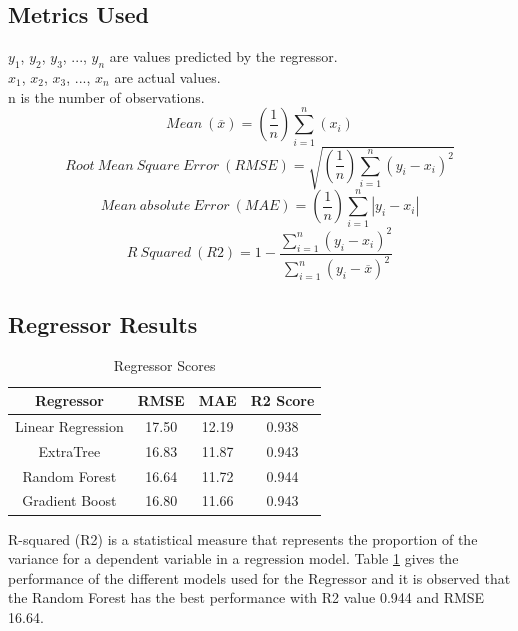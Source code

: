 \documentclass[12pt]{article}
\begin{document}
\subsection{Metrics Used}
$y_{1}$, $y_{2}$, $y_{3}$, ..., $y_{n}$ are values predicted by the regressor.\\
$x_{1}$, $x_{2}$, $x_{3}$, ..., $x_{n}$ are actual values.\\
 n is the number of observations.\\ 
$$Mean\ (\overline{x}) =(\frac{1}{n})\sum_{i=1}^{n}(x_{i})$$
$$Root\ Mean\ Square\ Error\ (RMSE) =\sqrt{(\frac{1}{n})\sum_{i=1}^{n}(y_{i} - x_{i})^{2}}$$
$$Mean\ absolute\ Error\ (MAE)=(\frac{1}{n})\sum_{i=1}^{n}\left | y_{i} - x_{i} \right |$$
$$R\ Squared\ (R2)= 1 - \frac{\sum_{i=1}^{n}(y_{i} - x_{i})^{2}}{\sum_{i=1}^{n}(y_{i} - \overline{x})^{2}}$$ 
 
\subsection{Regressor Results}
\begin{table}[H]
    \centering
    \begin{tabular}{|c|c|c|c|}
    \hline
    \textbf{Regressor} & \textbf{RMSE} & \textbf{MAE} & \textbf{R2 Score} \\
    \hline
    Linear Regression & 17.50 & 12.19 & 0.938 \\
    \hline
    ExtraTree & 16.83 & 11.87 & 0.943 \\
    \hline
    Random Forest & 16.64 & 11.72 & 0.944 \\
    \hline
    Gradient Boost & 16.80 & 11.66 & 0.943 \\
    \hline
    \end{tabular}
    \caption{Regressor Scores}
    \label{tab:Table 7}
\end{table}
R-squared (R2) is a statistical measure that represents the proportion of the variance for a dependent variable in a regression model.
Table \ref{tab:Table 7} gives the performance of the different models used for the Regressor and it is observed that the Random Forest has the best performance with R2 value 0.944 and RMSE 16.64.
\end{document}

